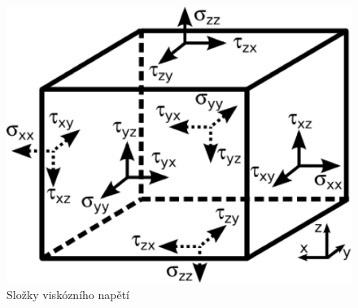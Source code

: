 \begin{figure}[h!]
\centering
  \includegraphics[scale=0.13]{images/stresses.eps}
  \caption{Složky viskózního napětí}
  \label{fig:stresses}
\end{figure} 

